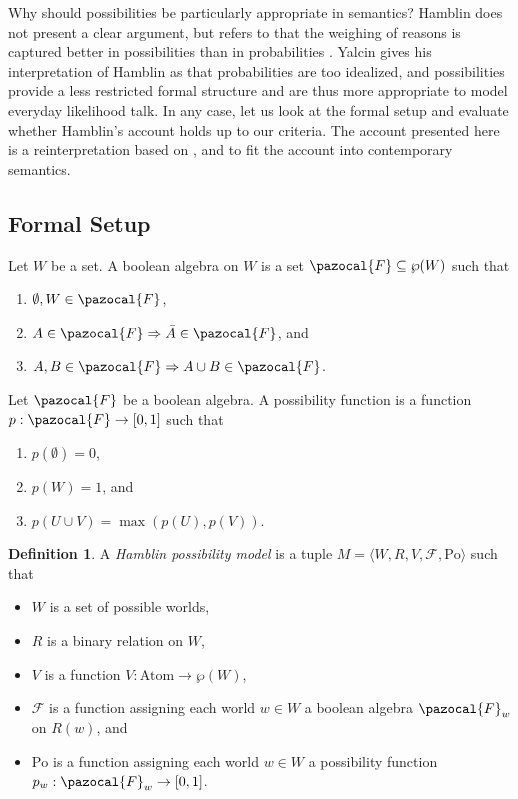 \documentclass{article}
\theoremstyle{definition}
\newtheorem{definition}{Definition}
\newcommand{\F}{\pazocal{F}}
\newcommand{\Po}{\text{Po}}
\begin{document}
Why should possibilities be particularly appropriate in semantics? Hamblin does not present a clear argument, but refers to that the weighing of reasons is captured better in possibilities than in probabilities \parencite[][p.~240]{hamblin59_modal_probab}.
Yalcin gives his interpretation of Hamblin as that probabilities are too idealized, and possibilities provide a less restricted formal structure and are thus more appropriate to model everyday likelihood talk.
In any case, let us look at the formal setup and evaluate whether Hamblin's account holds up to our criteria. 
The account presented here is a reinterpretation based on \textcite{hamblin59_modal_probab}, \textcite[][pp.~42]{halpern03_reason_about_uncer} and \textcite{yalcin10_probab_operat} to fit the account into contemporary semantics.

\subsection{Formal Setup}
\noindent Let $W$ be a set. A boolean algebra on $W$ is a set $\F \subseteq \wp(W)$ such that
\begin{enumerate}[nosep]
  \item $\emptyset, W \in \F$,
  \item $A \in \F \Rightarrow \bar{A} \in \F$, and
  \item $A,B \in \F \Rightarrow A \cup B \in \F$.
\end{enumerate}

\noindent Let $\F$ be a boolean algebra. A possibility function is a function $p: \F \rightarrow [0,1]$ such that
\begin{enumerate}[nosep]
  \item $p(\emptyset) = 0$,
  \item $p(W) = 1$, and
  \item $p(U \cup V) = \max(p(U),p(V))$.
\end{enumerate}
\begin{definition}
    A \emph{Hamblin possibility model} is a tuple $M = \langle W,R,V,\mathcal{F},\Po\rangle$ such that
    \begin{itemize}[nosep]
        \renewcommand\labelitemi{--}
      \item $W$ is a set of possible worlds,
      \item $R$ is a binary relation on $W$,
        \item $V$ is a function $V: \text{Atom} \rightarrow \wp(W)$,
        \item $\mathcal{F}$ is a function assigning each world $w \in W$ a boolean algebra $\F_w$ on $R(w)$, and 
          \item $\Po$ is a function assigning each world $w \in W$ a possibility function \\ $p_w: \F_w \rightarrow [0,1]$.
    \end{itemize}
\end{definition}
\end{document}
